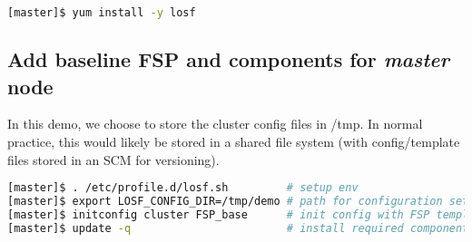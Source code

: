\documentclass[letterpaper]{article}
\begin{document}

\begin{lstlisting}[language=bash,caption={Commands run on {\bf master node}.}]
[master]$ yum install -y losf
\end{lstlisting}


\subsection{Add baseline FSP and components for {\em master} node}

In this demo, we choose to store the cluster config files in /tmp. In normal
practice, this would likely be stored in a shared file system (with
config/template files stored in an SCM for versioning).

\begin{lstlisting}[language=bash,keywords={}]
[master]$ . /etc/profile.d/losf.sh         # setup env
[master]$ export LOSF_CONFIG_DIR=/tmp/demo # path for configuration setup
[master]$ initconfig cluster FSP_base      # init config with FSP template
[master]$ update -q                        # install required components
\end{lstlisting}
\end{document}
